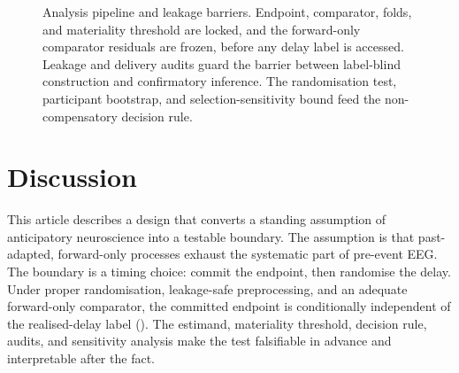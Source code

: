 \documentclass[11pt,a4paper]{article}
\theoremstyle{definition}
\newcommand{\UCB}{\mathrm{UCB}_{0.95}}
\begin{document}
\begin{figure}[t]
\centering
{}
\caption{Analysis pipeline and leakage barriers. Endpoint, comparator, folds, and
materiality threshold are locked, and the forward-only comparator residuals are frozen, before any
delay label is accessed. Leakage and delivery audits guard the barrier between
label-blind construction and confirmatory inference. The randomisation test,
participant bootstrap, and selection-sensitivity bound feed the non-compensatory
decision rule.}
\label{fig:pipeline}
\end{figure}

\section{Discussion}
\label{sec:discussion}

This article describes a design that converts a standing assumption of
anticipatory neuroscience into a testable boundary. The assumption is that
past-adapted, forward-only processes exhaust the systematic part of pre-event
EEG. The boundary is a timing choice: commit the endpoint, then randomise the
delay. Under proper randomisation, leakage-safe preprocessing, and an adequate
forward-only comparator, the committed endpoint is conditionally independent of
the realised-delay label (). The estimand, materiality
threshold, decision rule, audits, and sensitivity analysis make the test
falsifiable in advance and interpretable after the fact.
\end{document}
